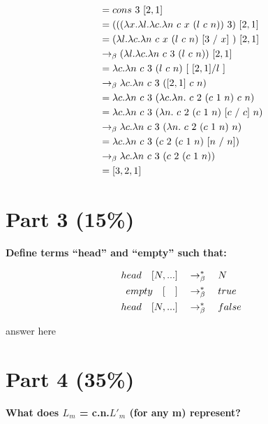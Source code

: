 \documentclass{article}
\begin{document}
	\begin{align*}
		&= cons \ 3 \ [2,1]  \\
		&= (((\la x.\la l.\la c.\la n \ c \ x \ (l \ c \ n))\ 3) \ [2,1] \\
		&= (\la l.\la c.\la n \ c \ x \ (l \ c \ n) \ [3 \ / \ x] \ ) \ [2,1] \\
		&\equals (\la l.\la c.\la n \ c \ 3 \ (l \ c \ n)) \ [2,1] \\
		&= \la c.\la n \ c \ 3 \ (l \ c \ n) \ [ \ [2,1] / l \ ] \\
		&\equals \la c.\la n \ c \ 3 \ ([2,1] \ c \ n) \\
		&= \la c.\la n \ c \ 3 \ (\la c.\la n. \ c \ 2 \ (c \ 1 \ n) \ c \ n) \\
		&= \la c.\la n \ c \ 3 \ (\la n. \ c \ 2 \ (c \ 1 \ n) \ [c \ / \ c] \ n) \\
		&\equals \la c.\la n \ c \ 3 \ (\la n. \ c \ 2 \ (c \ 1 \ n) \ n) \\
		&= \la c.\la n \ c \ 3 \ ( c \ 2 \ (c \ 1 \ n) \ [n \ / \ n]) \\
		&\equals \la c.\la n \ c \ 3 \ ( c \ 2 \ (c \ 1 \ n)) \\
		&= [3,2,1]
	\end{align*}
	
	
	\section{Part 3 (15\%)}
	\textbf{Define terms ``head'' and ``empty'' such that:}
	
	\begin{align*}
		head \quad [ N, ...] &\quad \rightarrow_\beta^*\quad  N\\
		empty \quad [\quad] &\quad \rightarrow_\beta^*\quad true\\
		head \quad [ N, ...] &\quad \rightarrow_\beta^*\quad false
	\end{align*}
	
	answer here
	
	
	\section{Part 4 (35\%)}

	\textbf{What does $L_m$ = \lamb c.\lamb n.$L'_m$ (for any m) represent?}\\
	
\end{document}
